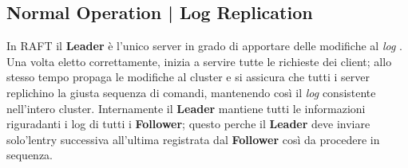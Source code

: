 \subsection{Normal Operation | Log Replication}
In RAFT il \textbf{Leader} è l'unico server in grado di apportare delle modifiche al \textit{log} . Una volta eletto correttamente, inizia a servire tutte le richieste dei client; allo stesso tempo propaga le modifiche al cluster e si assicura che tutti i server replichino la giusta sequenza di comandi, mantenendo così il \textit{log} consistente nell'intero cluster.
Internamente il \textbf{Leader} mantiene tutti le informazioni riguradanti i log di tutti i \textbf{Follower}; questo perche il \textbf{Leader} deve inviare solo'lentry successiva all'ultima registrata dal \textbf{Follower} così da procedere in sequenza.

